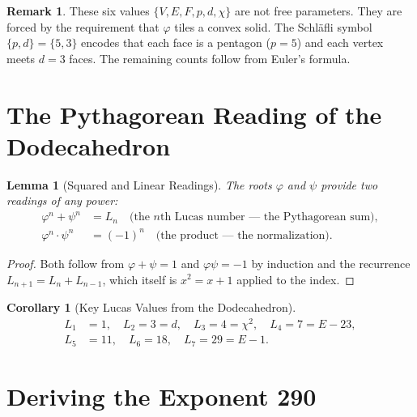 \documentclass[11pt,a4paper]{article}
\theoremstyle{plain}
\newtheorem{lemma}[theorem]{Lemma}
\newtheorem{corollary}[theorem]{Corollary}
\theoremstyle{definition}
\newtheorem{remark}[theorem]{Remark}
\newcommand{\vp}{\varphi}
\begin{document}
\begin{remark}
These six values $\{V, E, F, p, d, \chi\}$ are not free parameters.
They are forced by the requirement that $\vp$ tiles a convex solid.
The Schl\"{a}fli symbol $\{p, d\} = \{5, 3\}$ encodes that each face
is a pentagon ($p = 5$) and each vertex meets $d = 3$ faces.  The
remaining counts follow from Euler's formula.
\end{remark}

\section{The Pythagorean Reading of the Dodecahedron}\label{sec:pyth-dodec}

\begin{lemma}[Squared and Linear Readings]\label{lem:readings}
The roots $\vp$ and $\psi$ provide two readings of any power:
\begin{align}
  \vp^n + \psi^n &= L_n \quad\text{(the $n$th Lucas number --- the Pythagorean sum)}, \label{eq:lucas}\\
  \vp^n \cdot \psi^n &= (-1)^n \quad\text{(the product --- the normalization)}. \label{eq:product}
\end{align}
\end{lemma}

\begin{proof}
Both follow from $\vp + \psi = 1$ and $\vp\psi = -1$ by induction
and the recurrence $L_{n+1} = L_n + L_{n-1}$, which itself is
$x^2 = x + 1$ applied to the index.
\end{proof}

\begin{corollary}[Key Lucas Values from the Dodecahedron]\label{cor:lucas}
\begin{align*}
  L_1 &= 1, \quad L_2 = 3 = d, \quad L_3 = 4 = \chi^2, \quad
  L_4 = 7 = E - 23, \\
  L_5 &= 11, \quad L_6 = 18, \quad L_7 = 29 = E - 1.
\end{align*}
\end{corollary}

\section{Deriving the Exponent 290}\label{sec:exponent}
\end{document}
